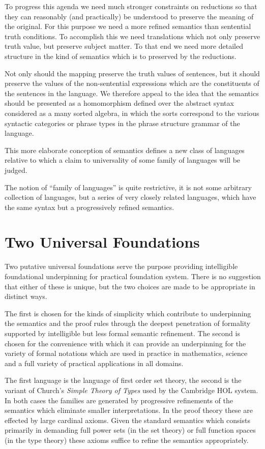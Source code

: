 \documentclass[10pt,titlepage]{book}
\begin{document}
To progress this agenda we need much stronger constraints on reductions so that they can reasonably (and practically) be understood to preserve the meaning of the original.
For this purpose we need a more refined semantics than sentential truth conditions.
To accomplish this we need translations which not only preserve truth value, but preserve subject matter.
To that end we need more detailed structure in the kind of semantics which is to preserved by the reductions.

Not only should the mapping preserve the truth values of sentences, but it should preserve the values of the non-sentential expressions  which are the constituents of the sentences in the language.
We therefore appeal to the idea that the semantics should be presented as a homomorphism defined over the abstract syntax considered as a many sorted algebra, in which the sorts correspond to the various syntactic categories or phrase types in the phrase structure grammar of the language.

This more elaborate conception of semantics defines a new class of languages relative to which a claim to universality of some family of languages will be judged.

The notion of ``family of languages'' is quite restrictive, it is not some arbitrary collection of languages, but a series of very closely related languages, which have the same syntax but a progressively refined semantics.

\section{Two Universal Foundations}

Two putative universal foundations serve the purpose providing intelligible foundational underpinning for practical foundation system.
There is no suggestion that either of these is unique, but the two choices are made to be appropriate in distinct ways.

The first is chosen for the kinds of simplicity which contribute to underpinning the semantics and the proof rules through the deepest penetration of formality supported by intelligible but less formal semantic refinement.
The second is chosen for the convenience with which it can provide an underpinning for the variety of formal notations which are used in practice in mathematics, science and a full variety of practical applications in all domains.

The first language is the language of first order set theory, the second is the variant of Church's \emph{Simple Theory of Types} used by the Cambridge HOL system.
In both cases the families are generated by progressive refinements of the semantics which eliminate smaller interpretations.
In the proof theory these are effected by large cardinal axioms.
Given the standard semantics which consists primarily in demanding full power sets (in the set theory) or full function spaces (in the type theory) these axioms suffice to refine the semantics appropriately.
\end{document}
